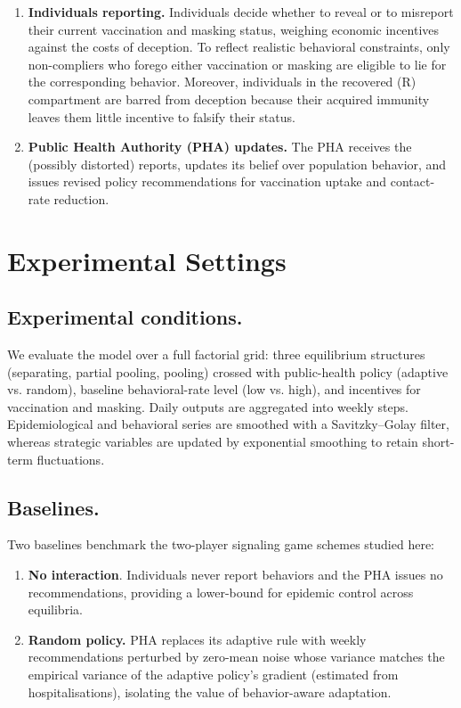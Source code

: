 \documentclass[sigconf,review]{acmart}
\begin{document}
\begin{enumerate}
\item {\bf Individuals reporting.} Individuals decide whether to reveal or to misreport their current vaccination and masking status, weighing economic incentives against the costs of deception. To reflect realistic behavioral constraints, only non-compliers who forego either vaccination or masking are eligible to lie for the corresponding behavior. Moreover, individuals in the recovered (R) compartment are barred from deception because their acquired immunity leaves them little incentive to falsify their status.

\item {\bf Public Health Authority (PHA) updates.} The PHA receives the (possibly distorted) reports, updates its belief over population behavior, and issues revised policy recommendations for vaccination uptake and contact-rate reduction.
\end{enumerate}


\section{Experimental Settings}
\label{supp:settings} 

\subsection{Experimental conditions.}
We evaluate the model over a full factorial grid: three equilibrium structures (separating, partial pooling, pooling) crossed with public-health policy (adaptive vs. random), baseline behavioral-rate level (low vs. high), and incentives for vaccination and masking.
Daily outputs are aggregated into weekly steps. Epidemiological and behavioral series are smoothed with a Savitzky–Golay filter, whereas strategic variables are updated by exponential smoothing to retain short-term fluctuations.

\subsection{Baselines.} Two baselines benchmark the two-player signaling game schemes studied here:

\begin{enumerate}
\item {\bf No interaction}. Individuals never report behaviors and the PHA issues no recommendations, providing a lower-bound for epidemic control across equilibria.

\item {\bf Random policy.} PHA replaces its adaptive rule with weekly recommendations perturbed by zero-mean noise whose variance matches the empirical variance of the adaptive policy’s gradient (estimated from hospitalisations), isolating the value of behavior-aware adaptation.
\end{enumerate}
\end{document}
